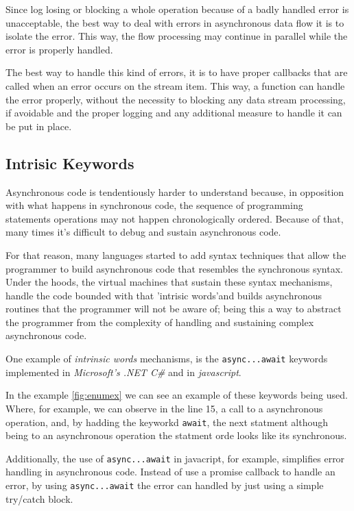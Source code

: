 	Since log losing or blocking a whole operation because of a badly handled error is unacceptable, the best way to deal with errors in asynchronous data flow it is to isolate the error. This way, the flow processing may continue in parallel while the error is properly handled.
	
	The best way to handle this kind of errors, it is to have proper callbacks that are called when an error occurs on the stream item. This way, a function can handle the error properly, without the necessity to blocking any data stream processing, if avoidable and the proper logging and any additional measure to handle it can be put in place.
	\clearpage
	

	\subsection{Intrisic Keywords} 
	
	Asynchronous code is tendentiously harder to understand because, in opposition with what happens in synchronous code, the sequence of programming statements operations may not happen chronologically ordered. 
	Because of that, many times it's difficult to debug and sustain asynchronous code. 

	For that reason, many languages started to add syntax techniques that allow the programmer to build asynchronous code that resembles the synchronous syntax.
	Under the hoods, the virtual machines that sustain these syntax mechanisms, handle the code bounded with that 'intrisic words'and builds asynchronous routines that the programmer will not be aware of;
	being this a way to abstract the programmer from the complexity of handling and sustaining complex asynchronous code. 

	One example of \textit{intrinsic words} mechanisms, is the \texttt{async...await} keywords implemented in \textit{Microsoft's .NET C\#} and in \textit{javascript}. 
	
	In the example \ref{fig:enumex} we can see an example of these keywords being used. 
	Where, for example, we can observe in the line 15, a call to a asynchronous operation, and, by hadding the keyworkd \texttt{await}, the next statment although being to an asynchronous operation the statment orde looks like its synchronous. 
	
	Additionally, the use of \texttt{async...await} in javacript, for example, simplifies error handling in asynchronous code. Instead of use a promise callback to handle an error, by using \texttt{async...await} the error can handled by just using a simple try/catch block. 
	
